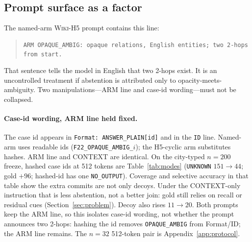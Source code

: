 \documentclass[10pt]{article} %
\begin{document}
\subsection{Prompt surface as a factor}
\label{sec:header}

The named-arm \textsc{Wiki-H5} prompt contains this line:

\begin{quote}
\small
\texttt{ARM OPAQUE\_AMBIG: opaque relations, English entities; two 2-hops from start.}
\end{quote}

That sentence tells the model in English that two 2-hops exist. It is an
uncontrolled treatment if abstention is attributed only to
opacity-meets-ambiguity. Two manipulations---ARM line and case-id
wording---must not be collapsed.

\paragraph{Case-id wording, ARM line held fixed.}
The case id appears in \texttt{Format: ANSWER\_PLAIN[id]} and in the
\texttt{ID} line. Named-arm uses readable ids
(\texttt{F22\_OPAQUE\_AMBIG\_$i$}); the H5-cyclic arm substitutes hashes.
ARM line and CONTEXT are identical.
On the city-typed $n{=}200$ freeze, hashed case ids at 512 tokens are
Table~\ref{tab:modes} (\texttt{UNKNOWN} $151\to 44$; gold ${+}96$; hashed-id has one
\texttt{NO\_OUTPUT}).
Coverage and selective accuracy in that table show the extra commits are
not only decoys.
Under the CONTEXT-only instruction that is less abstention, not a better join:
gold still relies on recall or residual cues (Section~\ref{sec:problem}).
Decoy also rises $11\to 20$.
Both prompts keep the ARM line, so this isolates case-id wording, not
whether the prompt announces two 2-hops: hashing the id removes
\texttt{OPAQUE\_AMBIG} from Format/ID; the ARM line remains.
The $n{=}32$ 512-token pair is Appendix~\ref{app:protocol}.
\end{document}
